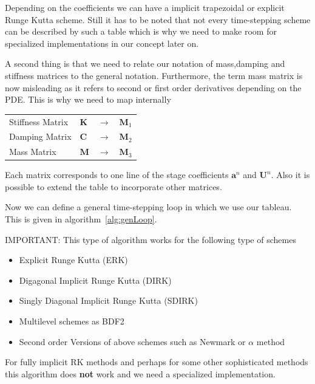 Depending on the coefficients we can have a implicit trapezoidal or explicit Runge Kutta scheme.
Still it has to be noted that not every time-stepping scheme can be described by such a table which
is why we need to make room for specialized implementations in our concept later on.

A second thing is that we need to relate our notation of mass,damping and stiffness matrices to the
general notation. Furthermore, the term mass matrix is now misleading as it refers to second or
first order derivatives depending on the PDE. This is why we need to map internally 
\begin{table}[H]
\begin{center}
\begin{tabular}{llcr}
Stiffness Matrix & $\mathbf{K}$ & $\rightarrow$ & $\mathbf{M}_1$ \\
Damping Matrix & $\mathbf{C}$ & $\rightarrow$ & $\mathbf{M}_2$ \\
Mass Matrix & $\mathbf{M}$ & $\rightarrow$ & $\mathbf{M}_3$ \\
\end{tabular}
\end{center}
\end{table}
Each matrix corresponds to one line of the stage coefficients $\mathbf{a}^n$ and $\mathbf{U}^n$. Also it is
possible to extend the table to incorporate other matrices.

Now we can define a general time-stepping loop in which we use our tableau. This is given in
algorithm~\ref{alg:genLoop}.

IMPORTANT: This type of algorithm works for the following type of schemes
\begin{itemize}
\item Explicit Runge Kutta (ERK)
\item Digagonal Implicit Runge Kutta (DIRK)
\item Singly Diagonal Implicit Runge Kutta (SDIRK)
\item Multilevel schemes as BDF2
\item Second order Versions of above schemes such as Newmark or $\alpha$ method
\end{itemize}
For fully implicit RK methods and perhaps for some other sophisticated methods this algorithm does
{\bf not} work and we need a specialized implementation. 

